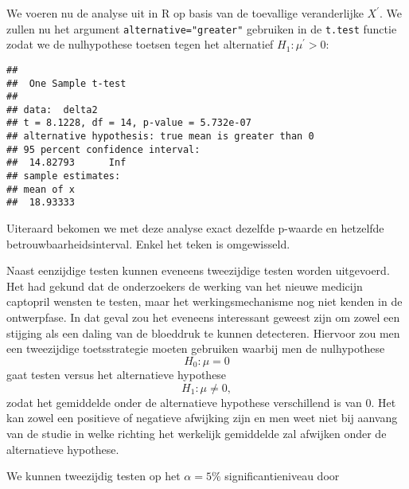 \documentclass[
  12pt,dutch,coursenotes]{book}
\newenvironment{Shaded}{\begin{snugshade}}{\end{snugshade}}
\newcommand{\DataTypeTok}[1]{\textcolor[rgb]{0.13,0.29,0.53}{#1}}
\newcommand{\KeywordTok}[1]{\textcolor[rgb]{0.13,0.29,0.53}{\textbf{#1}}}
\newcommand{\NormalTok}[1]{#1}
\newcommand{\OperatorTok}[1]{\textcolor[rgb]{0.81,0.36,0.00}{\textbf{#1}}}
\newcommand{\StringTok}[1]{\textcolor[rgb]{0.31,0.60,0.02}{#1}}
\theoremstyle{definition}
\theoremstyle{definition}
\theoremstyle{definition}
\theoremstyle{remark}
\begin{document}
We voeren nu de analyse uit in R op basis van de toevallige veranderlijke \(X^\prime\). We zullen nu het argument \texttt{alternative="greater"} gebruiken in de \texttt{t.test} functie zodat we de nulhypothese toetsen tegen het alternatief \(H_1: \mu^\prime>0\):

\begin{Shaded}
\end{Shaded}

\begin{verbatim}
## 
## 	One Sample t-test
## 
## data:  delta2
## t = 8.1228, df = 14, p-value = 5.732e-07
## alternative hypothesis: true mean is greater than 0
## 95 percent confidence interval:
##  14.82793      Inf
## sample estimates:
## mean of x 
##  18.93333
\end{verbatim}

Uiteraard bekomen we met deze analyse exact dezelfde p-waarde en hetzelfde betrouwbaarheidsinterval. Enkel het teken is omgewisseld.

Naast eenzijdige testen kunnen eveneens tweezijdige testen worden uitgevoerd.
Het had gekund dat de onderzoekers de werking van het nieuwe medicijn captopril wensten te testen, maar het werkingsmechanisme nog niet kenden in de ontwerpfase. In dat geval zou het eveneens interessant geweest zijn om zowel een stijging als een daling van de bloeddruk te kunnen detecteren.
Hiervoor zou men een tweezijdige toetsstrategie moeten gebruiken waarbij men de nulhypothese
\[H_0: \mu=0\]
gaat testen versus het alternatieve hypothese
\[H_1: \mu\neq0,\]
zodat het gemiddelde onder de alternatieve hypothese verschillend is van 0. Het kan zowel een positieve of negatieve afwijking zijn en men weet niet bij aanvang van de studie in welke richting het werkelijk gemiddelde zal afwijken onder de alternatieve hypothese.

We kunnen tweezijdig testen op het \(\alpha=5\%\) significantieniveau door
\end{document}
